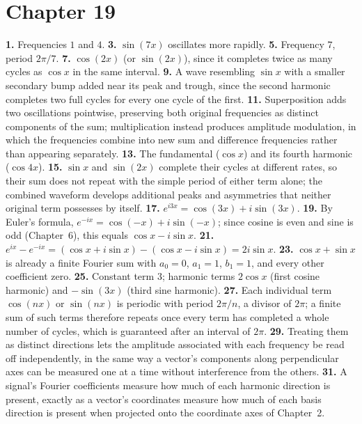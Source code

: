\section*{Chapter 19}
\textbf{1.} Frequencies $1$ and $4$. \quad
\textbf{3.} $\sin(7x)$ oscillates more rapidly. \quad
\textbf{5.} Frequency $7$, period $2\pi/7$. \quad
\textbf{7.} $\cos(2x)$ (or $\sin(2x)$), since it completes twice as many
cycles as $\cos x$ in the same interval. \quad
\textbf{9.} A wave resembling $\sin x$ with a smaller secondary bump
added near its peak and trough, since the second harmonic completes two
full cycles for every one cycle of the first. \quad
\textbf{11.} Superposition adds two oscillations pointwise, preserving
both original frequencies as distinct components of the sum;
multiplication instead produces amplitude modulation, in which the
frequencies combine into new sum and difference frequencies rather than
appearing separately. \quad
\textbf{13.} The fundamental ($\cos x$) and its fourth harmonic
($\cos4x$). \quad
\textbf{15.} $\sin x$ and $\sin(2x)$ complete their cycles at different
rates, so their sum does not repeat with the simple period of either
term alone; the combined waveform develops additional peaks and
asymmetries that neither original term possesses by itself. \quad
\textbf{17.} $e^{i3x} = \cos(3x) + i\sin(3x)$. \quad
\textbf{19.} By Euler's formula, $e^{-ix}=\cos(-x)+i\sin(-x)$; since
cosine is even and sine is odd (Chapter~6), this equals $\cos x -
i\sin x$. \quad
\textbf{21.} $e^{ix}-e^{-ix} = (\cos x+i\sin x)-(\cos x-i\sin x) =
2i\sin x$. \quad
\textbf{23.} $\cos x+\sin x$ is already a finite Fourier sum with
$a_0=0$, $a_1=1$, $b_1=1$, and every other coefficient zero. \quad
\textbf{25.} Constant term $3$; harmonic terms $2\cos x$ (first cosine
harmonic) and $-\sin(3x)$ (third sine harmonic). \quad
\textbf{27.} Each individual term $\cos(nx)$ or $\sin(nx)$ is periodic
with period $2\pi/n$, a divisor of $2\pi$; a finite sum of such terms
therefore repeats once every term has completed a whole number of
cycles, which is guaranteed after an interval of $2\pi$. \quad
\textbf{29.} Treating them as distinct directions lets the amplitude
associated with each frequency be read off independently, in the same
way a vector's components along perpendicular axes can be measured one
at a time without interference from the others. \quad
\textbf{31.} A signal's Fourier coefficients measure how much of each
harmonic direction is present, exactly as a vector's coordinates measure
how much of each basis direction is present when projected onto the
coordinate axes of Chapter~2. \quad
